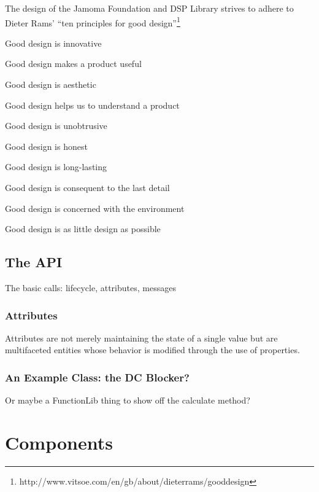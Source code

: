 \documentclass[twoside,10pt]{article}
\newenvironment{packed_item}{
\begin{itemize}
  \setlength{\itemsep}{1pt}
  \setlength{\parskip}{0pt}
  \setlength{\parsep}{0pt}
}{\end{itemize}}
\begin{document}
The design of the Jamoma Foundation and DSP Library strives to adhere to Dieter Rams' ``ten principles for good design''\footnote{http://www.vitsoe.com/en/gb/about/dieterrams/gooddesign}
\begin{packed_item}%
	\item Good design is innovative
	\item Good design makes a product useful
	\item Good design is aesthetic
	\item Good design helps us to understand a product
	\item Good design is unobtrusive
	\item Good design is honest
	\item Good design is long-lasting
	\item Good design is consequent to the last detail
	\item Good design is concerned with the environment
	\item Good design is as little design as possible
\end{packed_item}%


\subsection{The API}

The basic calls: lifecycle, attributes, messages

\subsubsection{Attributes}

Attributes are not merely maintaining the state of a single value but are multifaceted entities whose behavior is modified through the use of properties\cite{Place:2008params}.


\subsubsection{An Example Class: the DC Blocker?}

Or maybe a FunctionLib thing to show off the calculate method?



\section{Components} %
\end{document}
